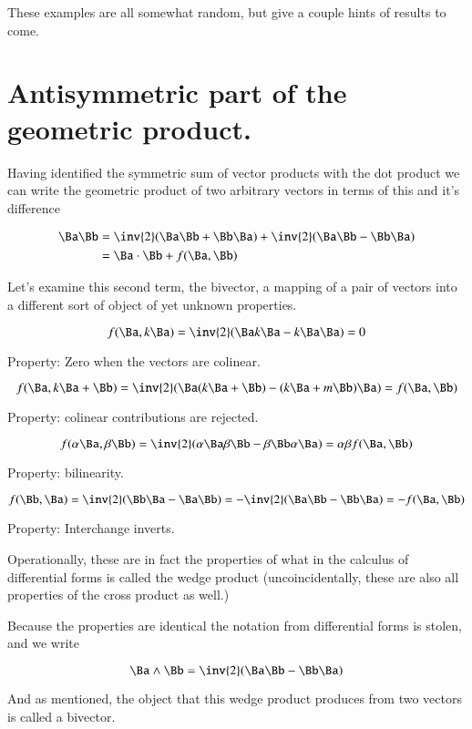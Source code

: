 These examples are all somewhat random, but give a couple hints of results to come.

\section{Antisymmetric part of the geometric product. }

Having identified the symmetric sum of vector products with the dot product we can write the geometric product of two arbitrary vectors
in terms of this and it's difference

\begin{align*}
\Ba \Bb 
&= \inv{2}(\Ba \Bb + \Bb \Ba) + \inv{2}(\Ba \Bb - \Bb \Ba) \\
&= \Ba \cdot \Bb + f(\Ba, \Bb) \\
\end{align*}

Let's examine this second term, the bivector, a mapping of a pair of vectors into a different sort of object of yet unknown properties.

\[
f(\Ba, k\Ba) = \inv{2}(\Ba k\Ba - k\Ba \Ba) = 0
\]

Property: Zero when the vectors are colinear.

\[
f(\Ba, k\Ba + \Bb) = \inv{2}(\Ba (k\Ba + \Bb) - (k\Ba + m\Bb)\Ba) = f(\Ba, \Bb)
\]

Property: colinear contributions are rejected.

\[
f(\alpha \Ba, \beta \Bb) = \inv{2}(\alpha \Ba \beta \Bb - \beta \Bb \alpha \Ba) = \alpha \beta f(\Ba, \Bb)
\]

Property: bilinearity.

\[
f(\Bb, \Ba) 
= \inv{2}(\Bb \Ba - \Ba\Bb) 
= -\inv{2}(\Ba \Bb - \Bb\Ba) 
= -f(\Ba, \Bb) 
\]

Property: Interchange inverts.

Operationally, these are in fact the properties of what in the calculus of differential forms is called the wedge product (uncoincidentally, these are also all properties of the cross product as well.)

Because the properties are identical the notation from differential forms is stolen, and we write

\begin{equation}\label{eqn:introGaFirst:wedge}
\Ba \wedge \Bb = \inv{2}(\Ba \Bb - \Bb \Ba)
\end{equation}

And as mentioned, the object that this 
wedge product produces from two vectors is called a bivector.

